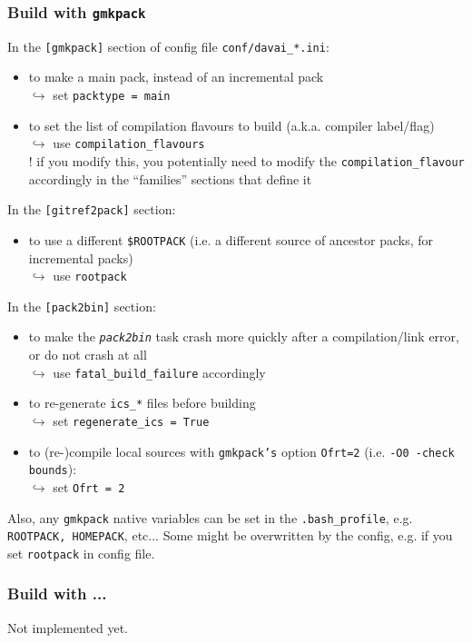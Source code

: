 \documentclass[a4paper,10pt,twoside]{article}
\begin{document}
\subsubsection{Build with \texttt{gmkpack}}
In the \texttt{[gmkpack]} section of config file \texttt{conf/davai\_*.ini}:
\begin{itemize}
 \item to make a main pack, instead of an incremental pack\\
 $\hookrightarrow$ set \texttt{packtype = main}
 \item to set the list of compilation flavours to build (a.k.a. compiler label/flag)\\
 $\hookrightarrow$ use \texttt{compilation\_flavours}\\
 ! if you modify this, you potentially need to modify the \texttt{compilation\_flavour} accordingly in the ``families'' sections that define it
\end{itemize}
In the \texttt{[gitref2pack]} section:
\begin{itemize}
 \item to use a different \texttt{\$ROOTPACK} (i.e. a different source of ancestor packs, for incremental packs)\\
 $\hookrightarrow$ use \texttt{rootpack}
\end{itemize}
In the \texttt{[pack2bin]} section:
\begin{itemize}
 \item to make the \texttt{\textit{pack2bin}} task crash more quickly after a compilation/link error, or do not crash at all\\
 $\hookrightarrow$ use \texttt{fatal\_build\_failure} accordingly
 \item to re-generate \texttt{ics\_*} files before building\\
 $\hookrightarrow$ set \texttt{regenerate\_ics = True}
 \item to (re-)compile local sources with \texttt{gmkpack's} option \texttt{Ofrt=2} (i.e. \texttt{-O0 -check bounds}):\\
 $\hookrightarrow$ set \texttt{Ofrt = 2}
\end{itemize}
\noindent Also, any \texttt{gmkpack} native variables can be set in the \texttt{.bash\_profile}, e.g. \texttt{ROOTPACK, HOMEPACK}, etc... Some might be overwritten by the config, e.g. if you set \texttt{rootpack} in config file.

\subsubsection{Build with ...}
Not implemented yet.
\end{document}
